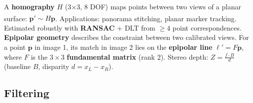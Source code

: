 \begin{tcbitemize}[ skin=sectionraster ]
    \tcbitem[title={Homography and Epipolar Geometry}, raster multicolumn=2]
    A \textbf{homography} $H$ (3×3, 8 DOF) maps points between two views of a planar surface\textsuperscript{\cite[][pp.~32--36]{hartleyZisserman2004}}:
    $\mathbf{p}' \sim H\mathbf{p}$.
    Applications: panorama stitching, planar marker tracking.
    Estimated robustly with \textbf{RANSAC} + DLT from $\geq 4$ point correspondences.
    \tcblower
    \textbf{Epipolar geometry} describes the constraint between two calibrated views.
    For a point $\mathbf{p}$ in image 1, its match in image 2 lies on the
    \textbf{epipolar line} $\ell' = F\mathbf{p}$, where $F$ is the $3{\times}3$ \textbf{fundamental matrix} (rank 2).
    Stereo depth: $Z = \frac{f \cdot B}{d}$ (baseline $B$, disparity $d = x_L - x_R$).
\end{tcbitemize}

\subsection{Filtering}

